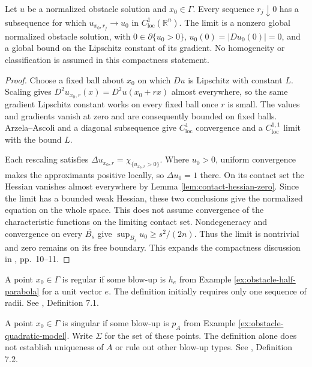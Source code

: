\begin{theorem}\label{thm:obstacle-blowup-compactness}
Let $u$ be a normalized obstacle solution and $x_0\in\Gamma$. Every sequence $r_j\downarrow0$ has a subsequence for which $u_{x_0,r_j}\to u_0$ in $C^1_{\mathrm{loc}}(\mathbb R^n)$. The limit is a nonzero global normalized obstacle solution, with $0\in\partial\{u_0>0\}$, $u_0(0)=|Du_0(0)|=0$, and a global bound on the Lipschitz constant of its gradient. No homogeneity or classification is assumed in this compactness statement.
\end{theorem}
\begin{proof}
Choose a fixed ball about $x_0$ on which $Du$ is Lipschitz with constant $L$. Scaling gives $D^2u_{x_0,r}(x)=D^2u(x_0+rx)$ almost everywhere, so the same gradient Lipschitz constant works on every fixed ball once $r$ is small. The values and gradients vanish at zero and are consequently bounded on fixed balls. Arzela--Ascoli and a diagonal subsequence give $C^1_{\mathrm{loc}}$ convergence and a $C^{1,1}_{\mathrm{loc}}$ limit with the bound $L$.

Each rescaling satisfies $\Delta u_{x_0,r}=\chi_{\{u_{x_0,r}>0\}}$. Where $u_0>0$, uniform convergence makes the approximants positive locally, so $\Delta u_0=1$ there. On its contact set the Hessian vanishes almost everywhere by Lemma \ref{lem:contact-hessian-zero}. Since the limit has a bounded weak Hessian, these two conclusions give the normalized equation on the whole space. This does not assume convergence of the characteristic functions on the limiting contact set. Nondegeneracy and convergence on every $\overline{B_s}$ give $\sup_{B_s}u_0\geq s^2/(2n)$. Thus the limit is nontrivial and zero remains on its free boundary. This expands the compactness discussion in \cite{Fig18}, pp.~10--11.
\end{proof}

\begin{definition}\label{def:obstacle-regular-point}
A point $x_0\in\Gamma$ is regular if some blow-up is $h_e$ from Example \ref{ex:obstacle-half-parabola} for a unit vector $e$. The definition initially requires only one sequence of radii. See \cite{Fig18}, Definition 7.1.
\end{definition}

\begin{definition}\label{def:obstacle-singular-point}
A point $x_0\in\Gamma$ is singular if some blow-up is $p_A$ from Example \ref{ex:obstacle-quadratic-model}. Write $\Sigma$ for the set of these points. The definition alone does not establish uniqueness of $A$ or rule out other blow-up types. See \cite{Fig18}, Definition 7.2.
\end{definition}

